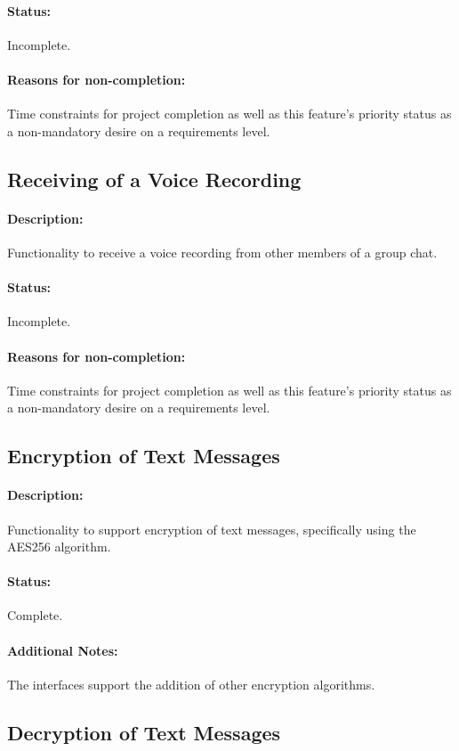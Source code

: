 \documentclass[11pt]{article}
\begin{document}
\paragraph{Status:} Incomplete.
\paragraph{Reasons for non-completion:} Time constraints for project completion as well as this feature's priority status as a non-mandatory desire on a requirements level.

\subsection{Receiving of a Voice Recording}
\paragraph{Description:} Functionality to receive a voice recording from other members of a group chat.
\paragraph{Status:} Incomplete.
\paragraph{Reasons for non-completion:} Time constraints for project completion as well as this feature's priority status as a non-mandatory desire on a requirements level.

\subsection{Encryption of Text Messages}
\paragraph{Description:} Functionality to support encryption of text messages, specifically using the AES256 algorithm.
\paragraph{Status:} Complete.
\paragraph{Additional Notes:} The interfaces support the addition of other encryption algorithms.

\subsection{Decryption of Text Messages}
\end{document}

